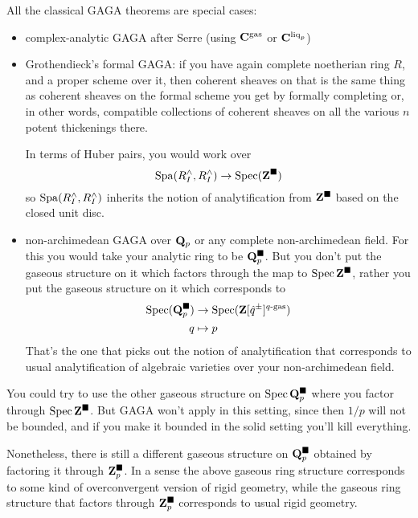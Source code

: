 All the classical GAGA theorems are special cases:
\begin{itemize}
  \item complex-analytic GAGA after Serre (using $\mathbf C^{\mathrm{gas}}$ or $\mathbf C^{\mathrm{liq}_p}$)
  \item Grothendieck's formal GAGA: if you have again complete noetherian ring $R$, and a proper scheme over it, then coherent sheaves on that is the same thing as coherent sheaves on the formal scheme you get by formally completing or, in other words, compatible collections of coherent sheaves on all the various $n$ potent thickenings there.

  In terms of Huber pairs, you would work over
  \[ \operatorname{Spa}(R^\land_I, R^\land_I) \to \operatorname{Spec}(\mathbf Z^\blacksquare) \]
  so $\operatorname{Spa}(R^\land_I, R^\land_I)$ inherits the notion of analytification from $\mathbf Z^\blacksquare$ based on the closed unit disc.
  
  \item non-archimedean GAGA over $\mathbf Q_p$ or any complete non-archimedean field. For this you would take your analytic ring to be $\mathbf Q_p^\blacksquare$. But you don't put the gaseous structure on it which factors through the map to $\operatorname{Spec}\mathbf Z^\blacksquare$, rather you put the gaseous structure on it which corresponds to
  \begin{align*}
    \operatorname{Spec}(\mathbf Q_p^\blacksquare) &\to \operatorname{Spec}(\mathbf Z[\hat q^\pm]^{\text{$q$-gas}})\\
    q &\mapsto p
  \end{align*}
  That's the one that picks out the notion of analytification that corresponds to usual analytification of algebraic varieties over your non-archimedean field.
\end{itemize} 

\begin{remark}
  You could try to use the other gaseous structure on $\operatorname{Spec}\mathbf Q_p^\blacksquare$ where you factor through $\operatorname{Spec}\mathbf Z^\blacksquare$. But GAGA won't apply in this setting, since then $1/p$ will not be bounded, and if you make it bounded in the solid setting you'll kill everything.

  Nonetheless, there is still a different gaseous structure on $\mathbf Q_p^\blacksquare$ obtained by factoring it through $\mathbf Z_p^\blacksquare$. In a sense the above gaseous ring structure corresponds to some kind of overconvergent version of rigid geometry, while the gaseous ring structure that factors through $\mathbf Z_p^\blacksquare$ corresponds to usual rigid geometry.
\end{remark}

